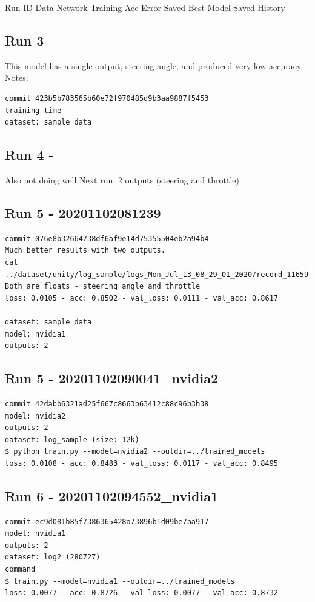 Run ID  Data    Network Training    Acc Error   Saved Best Model    Saved History

\subsection{Run 3}

This model has a single output, steering angle, and produced very low accuracy.
Notes:
\begin{verbatim}
commit 423b5b783565b60e72f970485d9b3aa9887f5453
training time
dataset: sample_data
\end{verbatim}

\subsection{Run 4 - }

Also not doing well
Next run, 2 outputs (steering and throttle)

\subsection{Run 5 - 20201102081239} 

\begin{verbatim}
commit 076e8b32664738df6af9e14d75355504eb2a94b4
Much better results with two outputs. 
cat ../dataset/unity/log_sample/logs_Mon_Jul_13_08_29_01_2020/record_11659.json
Both are floats - steering angle and throttle
loss: 0.0105 - acc: 0.8502 - val_loss: 0.0111 - val_acc: 0.8617

dataset: sample_data
model: nvidia1
outputs: 2
\end{verbatim}

\subsection{Run 5 - 20201102090041\_nvidia2}
\begin{verbatim}
commit 42dabb6321ad25f667c8663b63412c88c96b3b38
model: nvidia2
outputs: 2
dataset: log_sample (size: 12k)
$ python train.py --model=nvidia2 --outdir=../trained_models
loss: 0.0108 - acc: 0.8483 - val_loss: 0.0117 - val_acc: 0.8495
\end{verbatim}

\subsection{Run 6 - 20201102094552\_nvidia1}
\begin{verbatim}
commit ec9d081b85f7386365428a73896b1d09be7ba917
model: nvidia1
outputs: 2
dataset: log2 (280727)
command
$ train.py --model=nvidia1 --outdir=../trained_models
loss: 0.0077 - acc: 0.8726 - val_loss: 0.0077 - val_acc: 0.8732
\end{verbatim}

